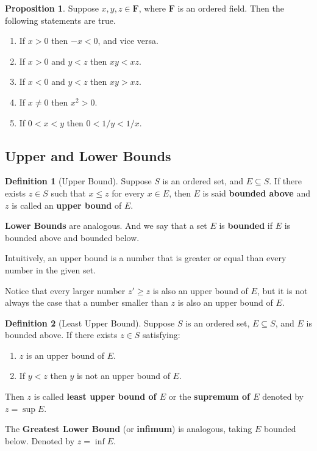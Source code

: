 \documentclass[12pt,a4paper]{article}
\theoremstyle{definition}
\newtheorem{proposition}[theorem]{Proposition}
\newtheorem{definition}{Definition}[section]
\begin{document}
\begin{proposition}
  Suppose $x, y, z \in \textbf{F}$, where $\textbf{F}$ is an ordered field. Then the following statements are true.
  \begin{enumerate}
    \item If $x > 0$ then $-x < 0$, and vice versa.
    \item If $x > 0$ and $y < z$ then $xy < xz$.
    \item If $x < 0$ and $y < z$ then $xy > xz$.
    \item If $x \neq 0$ then $x^2 > 0$.
    \item If $0 < x < y$ then $0 < 1/y < 1/x$.
  \end{enumerate}
\end{proposition}


\subsection{Upper and Lower Bounds}

\begin{definition}[Upper Bound]
  Suppose \(S\) is an ordered set, and \(E \subseteq S\). If there exists
  \(z \in S\) such that \(x \leq z\) for every \(x \in E\), then \(E\) is
  said \textbf{bounded above} and \(z\) is called an \textbf{upper bound}
  of \(E\).
  
  \textbf{Lower Bounds} are analogous. And we say that a set $E$ is \textbf{bounded} if $E$ is bounded above and bounded below. 
\end{definition}

Intuitively, an upper bound is a number that is greater or equal than every number in the given set.

Notice that every larger number $z' \geq z$ is also an upper bound of $E$, but it is not always the case that a number smaller than $z$ is also an upper bound of $E$.

\begin{definition}[Least Upper Bound]
  Suppose \(S\) is an ordered set, \(E \subseteq S\), and \(E\) is bounded
  above. If there exists \(z \in S\) satisfying:
  \begin{enumerate}
    \item \(z\) is an upper bound of \(E\).
    \item If \(y < z\) then \(y\) is not an upper bound of \(E\).
  \end{enumerate}
  Then \(z\) is called \textbf{least upper bound of \(E\)} or the \textbf{supremum of \(E\)} denoted by \(z = \sup E\).
  
  The \textbf{Greatest Lower Bound} (or \textbf{infimum}) is analogous, taking \(E\) bounded below. Denoted by \(z = \inf E\).
\end{definition}
\end{document}

